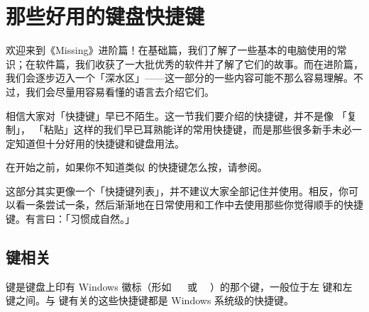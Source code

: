 \chapter{那些好用的键盘快捷键}

\begin{note}
  欢迎来到《Missing》进阶篇！在基础篇，我们了解了一些基本的电脑使用的常识；在软件篇，我们收获了一大批优秀的软件并了解了它们的故事。而在进阶篇，我们会逐步迈入一个「深水区」——这一部分的一些内容可能不那么容易理解。不过，我们会尽量用容易看懂的语言去介绍它们。
\end{note}

\begin{intro}
  相信大家对「快捷键」早已不陌生。这一节我们要介绍的快捷键，并不是像  「复制」， 「粘贴」这样的我们早已耳熟能详的常用快捷键，而是那些很多新手未必一定知道但十分好用的快捷键和键盘用法。
\end{intro}

在开始之前，如果你不知道类似  的快捷键怎么按，请参阅。

这部分其实更像一个「快捷键列表」，并不建议大家全部记住并使用。相反，你可以看一条尝试一条，然后渐渐地在日常使用和工作中去使用那些你觉得顺手的快捷键。有言曰：「习惯成自然。」

\section{\texorpdfstring{ 键相关}{Windows 键相关}}

 键是键盘上印有 Windows 徽标（形如\  \ 或\  \,）的那个键，一般位于左  键和左  键之间。与  键有关的这些快捷键都是 Windows 系统级的快捷键。


